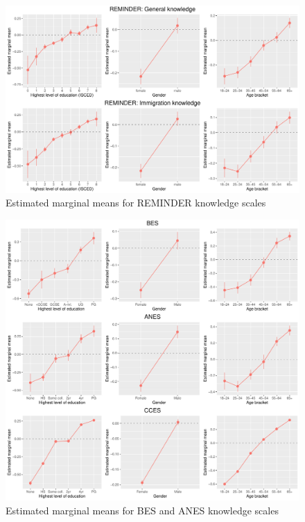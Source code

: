 \documentclass[11pt,halfline,a4paper,]{ouparticle}
\begin{document}
\begin{figure}[!h]
\includegraphics[width=1\linewidth]{Revisiting-the-Measurement-and-Dimensionality-of-Political-Knowledge--Evidence-from-Seven-European-Countries_files/figure-latex/emmeans_plots1-1} \caption{Estimated marginal means for REMINDER knowledge scales}\label{fig:emmeans_plots1}
\end{figure}

\begin{figure}[!h]
\includegraphics[width=1\linewidth]{Revisiting-the-Measurement-and-Dimensionality-of-Political-Knowledge--Evidence-from-Seven-European-Countries_files/figure-latex/emmeans_plots2-1} \caption{Estimated marginal means for BES and ANES knowledge scales}\label{fig:emmeans_plots2}
\end{figure}
\end{document}

